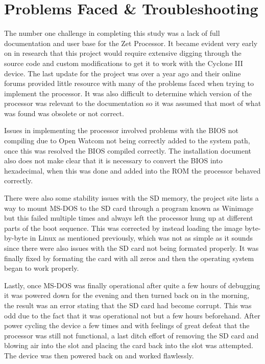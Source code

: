 \documentclass[conference]{IEEEtran}
\begin{document}
\section{Problems Faced \& Troubleshooting}
The number one challenge in completing this study was a lack of full documentation and user base for the Zet Processor. It became evident very early on in research that this project would require extensive digging through the source code and custom modifications to get it to work with the Cyclone III device. The last update for the project was over a year ago and their online forums provided little resource with many of the problems faced when trying to implement the processor. It was also difficult to determine which version of the processor was relevant to the documentation so it was assumed that most of what was found was obsolete or not correct.

Issues in implementing the processor involved problems with the BIOS not compiling due to Open Watcom not being correctly added to the system path, once this was resolved the BIOS compiled correctly. The installation document also does not make clear that it is necessary to convert the BIOS into hexadecimal, when this was done and added into the ROM the processor behaved correctly. 

There were also some stability issues with the SD memory, the project site lists a way to mount MS-DOS to the SD card through a program known as Winimage but this failed multiple times and always left the processor hung up at different parts of the boot sequence. This was corrected by instead loading the image byte-by-byte in Linux as mentioned previously, which was not as simple as it sounds since there were also issues with the SD card not being formated properly. It was finally fixed by formating the card with all zeros and then the operating system began to work properly.

Lastly, once MS-DOS was finally operational after quite a few hours of debugging it was powered down for the evening and then turned back on in the morning, the result was an error stating that the SD card had become corrupt. This was odd due to the fact that it was operational not but a few hours beforehand. After power cycling the device a few times and with feelings of great defeat that the processor was still not functional, a last ditch effort of removing the SD card and blowing air into the slot and placing the card back into the slot was attempted. The device was then powered back on and worked flawlessly.
\end{document}
